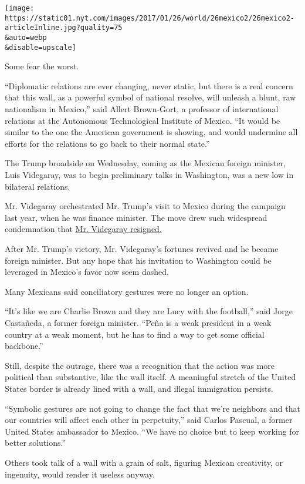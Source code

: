 \texttt{[image: https://static01.nyt.com/images/2017/01/26/world/26mexico2/26mexico2-articleInline.jpg?quality=75\\\&auto=webp\\\&disable=upscale]}

Some fear the worst.

``Diplomatic relations are ever changing, never static, but there is a
real concern that this wall, as a powerful symbol of national resolve,
will unleash a blunt, raw nationalism in Mexico,'' said Allert
Brown-Gort, a professor of international relations at the Autonomous
Technological Institute of Mexico. ``It would be similar to the one the
American government is showing, and would undermine all efforts for the
relations to go back to their normal state.''

The Trump broadside on Wednesday, coming as the Mexican foreign
minister, Luis Videgaray, was to begin preliminary talks in Washington,
was a new low in bilateral relations.

Mr. Videgaray orchestrated Mr. Trump's visit to Mexico during the
campaign last year, when he was finance minister. The move drew such
widespread condemnation that
\href{https://www.nytimes.com/2016/09/08/world/americas/mexico-finance-minister-luis-videgaray-resigns.html}{Mr.
Videgaray resigned.}

After Mr. Trump's victory, Mr. Videgaray's fortunes revived and he
became foreign minister. But any hope that his invitation to Washington
could be leveraged in Mexico's favor now seem dashed.

Many Mexicans said conciliatory gestures were no longer an option.

``It's like we are Charlie Brown and they are Lucy with the football,''
said Jorge Castañeda, a former foreign minister. ``Peña is a weak
president in a weak country at a weak moment, but he has to find a way
to get some official backbone.''

Still, despite the outrage, there was a recognition that the action was
more political than substantive, like the wall itself. A meaningful
stretch of the United States border is already lined with a wall, and
illegal immigration persists.

``Symbolic gestures are not going to change the fact that we're
neighbors and that our countries will affect each other in perpetuity,''
said Carlos Pascual, a former United States ambassador to Mexico. ``We
have no choice but to keep working for better solutions.''

Others took talk of a wall with a grain of salt, figuring Mexican
creativity, or ingenuity, would render it useless anyway.

